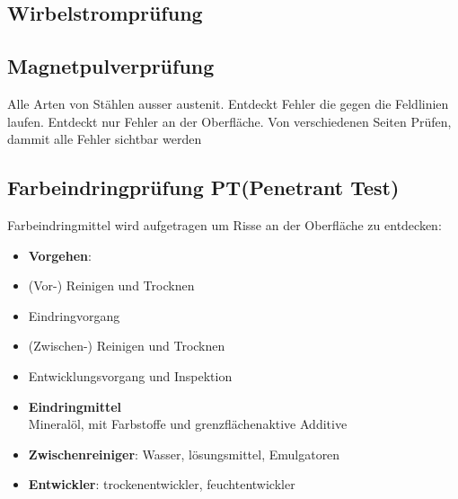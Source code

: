 \documentclass[8.5pt,twocolumn]{extarticle}
\begin{document}
    \subsection{Wirbelstromprüfung}
    \subsection{Magnetpulverprüfung}
    Alle Arten von Stählen ausser austenit. Entdeckt Fehler die gegen die Feldlinien laufen. Entdeckt nur Fehler an der Oberfläche. Von verschiedenen Seiten Prüfen, dammit alle Fehler sichtbar werden
    \subsection{Farbeindringprüfung PT(Penetrant Test)}
    Farbeindringmittel wird aufgetragen um Risse an der Oberfläche zu entdecken:\\
    \begin{minipage}[t]{0.70\columnwidth}
        \begin{itemize}[label={}, leftmargin=*, itemsep=0.01em]
            \item \textbf{Vorgehen}:
            \item (Vor-) Reinigen und Trocknen
            \item Eindringvorgang
            \item (Zwischen-) Reinigen und Trocknen
            \item Entwicklungsvorgang und Inspektion
        \end{itemize}
    \end{minipage}\hfill
    \begin{minipage}[t]{0.30\columnwidth}
        \begin{itemize}[label={}, leftmargin=*, itemsep=0.01em]
            \item  \textbf{Eindringmittel} \\ Mineralöl, mit Farbstoffe und
            grenzflächenaktive Additive
            
        \end{itemize}
    \end{minipage}\hfill
    \begin{itemize}[label={}, leftmargin=*, itemsep=0.01em]
        \item \textbf{Zwischenreiniger}: Wasser, lösungsmittel, Emulgatoren
        \item \textbf{Entwickler}: trockenentwickler, feuchtentwickler
    \end{itemize}
\end{document}
